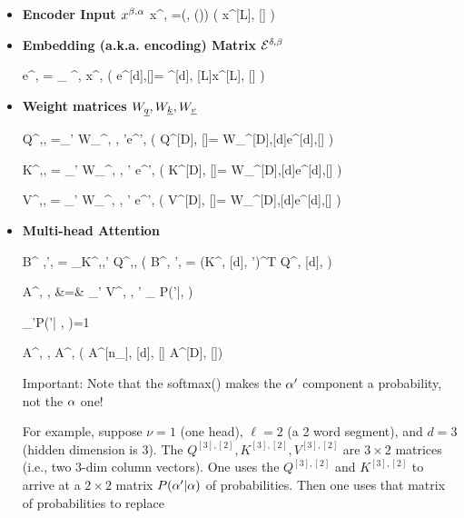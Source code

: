  \begin{itemize}

 \item {\bf Encoder Input $x^{\beta, \alpha}$}
 \beq
 x^{\beta, \alp} =\delta(\beta, \beta(\alp))
 \left(
 x^{[L], [\ell]} 
 \right)
 \eeq

\item {\bf Embedding (a.k.a. encoding) Matrix ${\cal E}^{\delta, \beta}$}

\beq
e^{\delta, \alp} = \sum_\beta
\cale^{\delta, \beta}
x^{\beta, \alp}
\;\;
\left(
e^{[d],[\ell]}= \cale^{[d], [L]}x^{[L], [\ell]}
\right)
\eeq

\item{\bf Weight matrices $W_\rvq, W_\rvk, W_\rvv$}

\beq
Q^{\nu,\delta, \alp}=\sum_{\delta'}
W_\rvq^{\nu, \delta, \delta'}e^{\delta', \alp}
\;\;
\left(
Q^{[D], [\ell]}=
W_\rvq^{[D],[d]}e^{[d],[\ell]}
\right)
\eeq


\beq
K^{\nu,\delta, \alp}=
\sum_{\delta'}
W_\rvk^{\nu, \delta, \delta'}
e^{\delta', \alp}
\;\;
\left(
K^{[D], [\ell]}=
W_\rvk^{[D],[d]}e^{[d],[\ell]}
\right)
\eeq

\beq
V^{\nu,\delta, \alp}=
\sum_{\delta'}
W_\rvv^{\nu, \delta, \delta'}
e^{\delta', \alp}
\;\;
\left(
V^{[D], [\ell]}=
W_\rvv^{[D],[d]}e^{[d],[\ell]}
\right)
\eeq

\item {\bf Multi-head Attention}

\beq
B^{
\nu,{\alp'}, \alp}=
\sum_\delta K^{\nu,\delta,{\alp'}}
Q^{\nu,\delta,\alp}
\;\;
\left(
B^{\nu, {\alp'}, \alp}=
(K^{\nu, [d], \alp'})^T Q^{\nu, [d], \alp}
\right)
\eeq

\beqa
A^{\nu,
\delta, \alp}&=&
\sum_{{\alp'}}
V^{\nu, \delta, {\alp'}}
_{
P({\alp'}|\alp, \nu)}
\eeqa

\beq
\sum_{{\alp'}\in [\ell]}P({\alp'}| \alp, \nu)=1
\eeq

\beq
A^{\nu, \delta, \alp}
\rarrow
A^{\Delta, \alp}
\left(
A^{[n_\rvh], [d], [\ell]}
\rarrow
A^{[D], [\ell]}\right)
\eeq


Important: Note that the softmax() makes the
${\alpha'}$ component a probability,
not the $\alpha$ one!

For example, suppose $\nu=1$ (one head), $\ell=2$ (a 2 word segment),
and $d=3$ (hidden dimension is 3).
The $Q^{[3], [2]}, K^{[3], [2]}, V^{[3], [2]}$ are $3\times 2$ matrices
(i.e., two 3-dim column vectors).
One uses the $Q^{[3], [2]}$ and $K^{[3], [2]}$ to arrive at a
$2\times 2$ matrix $P(\alpha'|\alpha)$
of probabilities.
Then one uses that matrix of probabilities to replace


\end{itemize}
